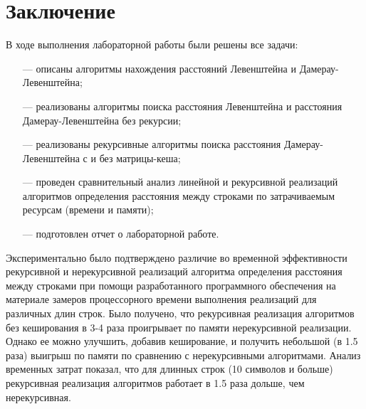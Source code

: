 \chapter*{Заключение}

В ходе выполнения лабораторной работы были решены все задачи:

\begin{itemize}
    \item[---] описаны алгоритмы нахождения расстояний Левенштейна и Дамерау-Левенштейна;
	\item[---] реализованы алгоритмы поиска расстояния Левенштейна и расстояния Дамерау-Левенштейна без рекурсии;
	\item[---] реализованы рекурсивные алгоритмы поиска расстояния Дамерау-Левенштейна с и без матрицы-кеша;
	\item[---] проведен сравнительный анализ линейной и рекурсивной реализаций алгоритмов определения расстояния между строками по затрачиваемым ресурсам (времени и памяти);
	\item[---] подготовлен отчет о лабораторной работе.
\end{itemize}

Экспериментально было подтверждено различие во временной эффективности рекурсивной и нерекурсивной реализаций алгоритма определения расстояния между строками при помощи разработанного программного обеспечения на материале замеров процессорного времени выполнения реализаций для различных длин строк. Было получено, что рекурсивная реализация алгоритмов без кеширования в 3-4 раза проигрывает по памяти нерекурсивной реализации. Однако ее можно улучшить, добавив кеширование, и получить небольшой (в 1.5 раза) выигрыш по памяти по сравнению с нерекурсивными алгоритмами. Анализ временных затрат показал, что для длинных строк (10 символов и больше) рекурсивная реализация алгоритмов работает в 1.5 раза дольше, чем нерекурсивная.
